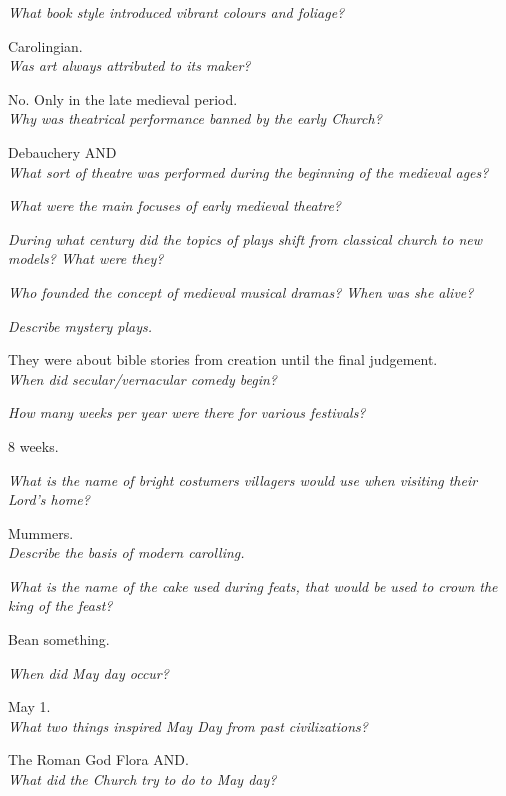 \documentclass[12pt]{article}
\begin{document}
\textit{What book style introduced vibrant colours and foliage?}

Carolingian.\\

\textit{Was art always attributed to its maker?}

No. Only in the late medieval period.\\

\textit{Why was theatrical performance banned by the early Church?}

Debauchery AND \\

\textit{What sort of theatre was performed during the beginning of the medieval ages?}

\textit{What were the main focuses of early medieval theatre?}

\textit{During what century did the topics of plays shift from classical church to new models? What were they?}

\textit{Who founded the concept of medieval musical dramas? When was she alive?}



\textit{Describe mystery plays.}

They were about bible stories from creation until the final judgement.\\

\textit{When did secular/vernacular comedy begin?}



\textit{How many weeks per year were there for various festivals?}

8 weeks.

\textit{What is the name of bright costumers villagers would use when visiting their Lord's home?}

Mummers.\\

\textit{Describe the basis of modern carolling.}

\textit{What is the name of the cake used during feats, that would be used to crown the king of the feast?}

Bean something.

\textit{When did May day occur?}

May 1.\\

\textit{What two things inspired May Day from past civilizations?}

The Roman God Flora AND.\\

\textit{What did the Church try to do to May day?}
\end{document}
